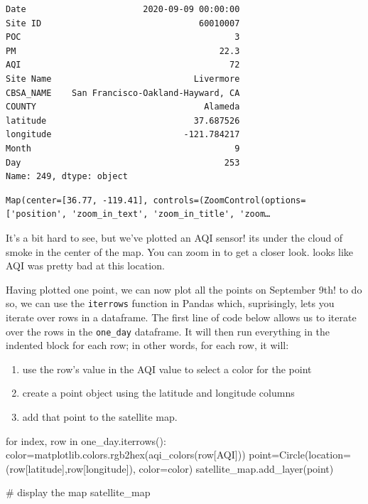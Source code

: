 \documentclass[
  letterpaper,
  DIV=11,
  numbers=noendperiod]{scrreprt}
\newenvironment{Shaded}{\begin{snugshade}}{\end{snugshade}}
\newcommand{\CommentTok}[1]{\textcolor[rgb]{0.37,0.37,0.37}{#1}}
\newcommand{\ControlFlowTok}[1]{\textcolor[rgb]{0.00,0.23,0.31}{#1}}
\newcommand{\KeywordTok}[1]{\textcolor[rgb]{0.00,0.23,0.31}{#1}}
\newcommand{\NormalTok}[1]{\textcolor[rgb]{0.00,0.23,0.31}{#1}}
\newcommand{\OperatorTok}[1]{\textcolor[rgb]{0.37,0.37,0.37}{#1}}
\newcommand{\StringTok}[1]{\textcolor[rgb]{0.13,0.47,0.30}{#1}}
\providecommand{\tightlist}{%
  \setlength{\itemsep}{0pt}\setlength{\parskip}{0pt}}\usepackage{longtable,booktabs,array}
\begin{document}
\begin{verbatim}
Date                       2020-09-09 00:00:00
Site ID                               60010007
POC                                          3
PM                                        22.3
AQI                                         72
Site Name                            Livermore
CBSA_NAME    San Francisco-Oakland-Hayward, CA
COUNTY                                 Alameda
latitude                             37.687526
longitude                          -121.784217
Month                                        9
Day                                        253
Name: 249, dtype: object
\end{verbatim}

\begin{verbatim}
Map(center=[36.77, -119.41], controls=(ZoomControl(options=['position', 'zoom_in_text', 'zoom_in_title', 'zoom…
\end{verbatim}

It's a bit hard to see, but we've plotted an AQI sensor! its under the
cloud of smoke in the center of the map. You can zoom in to get a closer
look. looks like AQI was pretty bad at this location.

Having plotted one point, we can now plot all the points on September
9th! to do so, we can use the \texttt{iterrows} function in Pandas
which, suprisingly, lets you iterate over rows in a dataframe. The first
line of code below allows us to iterate over the rows in the
\texttt{one\_day} dataframe. It will then run everything in the indented
block for each row; in other words, for each row, it will:

\begin{enumerate}
\def\labelenumi{\arabic{enumi}.}
\tightlist
\item
  use the row's value in the AQI value to select a color for the point
\item
  create a point object using the latitude and longitude columns
\item
  add that point to the satellite map.
\end{enumerate}

\begin{Shaded}
\begin{Highlighting}[]
\ControlFlowTok{for}\NormalTok{ index, row }\KeywordTok{in}\NormalTok{ one\_day.iterrows():}
\NormalTok{  color}\OperatorTok{=}\NormalTok{matplotlib.colors.rgb2hex(aqi\_colors(row[}\StringTok{\textquotesingle{}AQI\textquotesingle{}}\NormalTok{]))}
\NormalTok{  point}\OperatorTok{=}\NormalTok{Circle(location}\OperatorTok{=}\NormalTok{(row[}\StringTok{\textquotesingle{}latitude\textquotesingle{}}\NormalTok{],row[}\StringTok{\textquotesingle{}longitude\textquotesingle{}}\NormalTok{]), color}\OperatorTok{=}\NormalTok{color)}
\NormalTok{  satellite\_map.add\_layer(point)}

\CommentTok{\# display the map}
\NormalTok{satellite\_map}
\end{Highlighting}
\end{Shaded}
\end{document}

